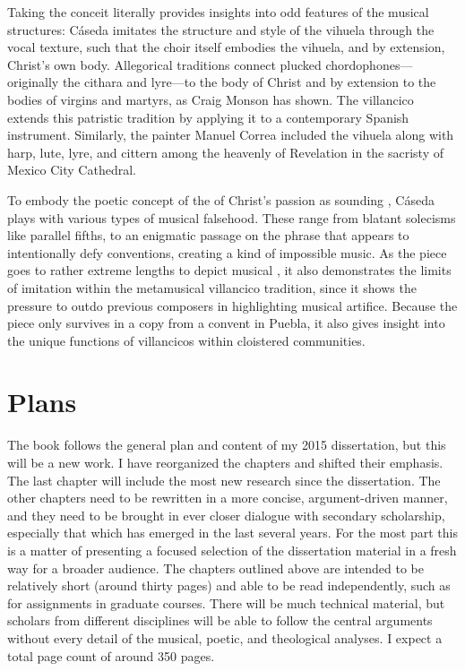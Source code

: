 \documentclass{vcbook-proposal}
\begin{document}
Taking the conceit literally provides insights into odd features of the musical 
structures: Cáseda imitates the structure and style of the vihuela through the 
vocal texture, such that the choir itself embodies the vihuela, and by 
extension, Christ's own body.
Allegorical traditions connect plucked chordophones---originally the cithara 
and lyre---to the body of Christ and by extension to the bodies of virgins and 
martyrs, as Craig Monson has shown.%
  \autocite{Monson:DivasConvent}
The villancico extends this patristic tradition by applying it to a 
contemporary Spanish instrument.
Similarly, the painter Manuel Correa included the vihuela along with harp, 
lute, lyre, and cittern among the heavenly  of 
Revelation in the sacristy of Mexico City Cathedral.

To embody the poetic concept of the  of Christ's passion as 
sounding , Cáseda plays with various types of musical falsehood.
These range from blatant solecisms like parallel fifths, to an enigmatic 
passage on the phrase  that appears to intentionally 
defy  conventions, creating a kind of impossible music.
As the piece goes to rather extreme lengths to depict musical 
, it also demonstrates the limits of imitation within the 
metamusical villancico tradition, since it shows the pressure to outdo previous 
composers in highlighting musical artifice.
Because the piece only survives in a copy from a convent in Puebla, it also 
gives insight into the unique functions of villancicos within cloistered 
communities.

\section{Plans}

The book follows the general plan and content of my 2015 dissertation, but this 
will be a new work.%
  \autocite{Cashner:PhD}
I have reorganized the chapters and shifted their emphasis.
The last chapter will include the most new research since the dissertation.
The other chapters need to be rewritten in a more concise, argument-driven 
manner, and they need to be brought in ever closer dialogue with secondary 
scholarship, especially that which has emerged in the last several years.
For the most part this is a matter of presenting a focused selection of the 
dissertation material in a fresh way for a broader audience.
The chapters outlined above are intended to be relatively short (around thirty 
pages) and able to be read independently, such as for assignments in graduate 
courses.
There will be much technical material, but scholars from different disciplines 
will be able to follow the central arguments without every detail of the 
musical, poetic, and theological analyses.
I expect a total page count of around 350 pages.
\end{document}
